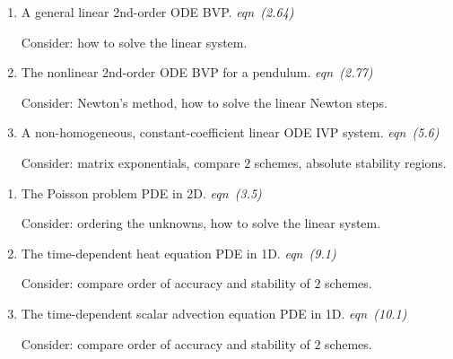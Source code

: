 \documentclass[12pt]{amsart}
\newcommand*\circled[1]{\tikz[baseline=(char.base)]{
            \node[shape=circle,draw,inner sep=2pt] (char) {#1};}}
\begin{document}
\medskip
\noindent \hrulefill

\newcommand{\ecomment}[1]{ \hfill \mbox{\emph{#1}} }

\renewcommand{\labelenumi}{\circled{\arabic{enumi}}}
\begin{enumerate}
\setlength{\itemsep}{4pt}

\item A general linear 2nd-order ODE BVP. \ecomment{eqn (2.64)}

\noindent Consider: how to solve the linear system.
\item The nonlinear 2nd-order ODE BVP for a pendulum.  \ecomment{eqn (2.77)}

\noindent Consider: Newton's method, how to solve the linear Newton steps.
\item A non-homogeneous, constant-coefficient linear ODE IVP system.  \ecomment{eqn (5.6)}

\noindent Consider: matrix exponentials, compare $2$ schemes, absolute stability regions.
\end{enumerate}

\noindent \hrulefill

\renewcommand{\labelenumi}{\circled{\alph{enumi}}}
\begin{enumerate}
\setlength{\itemsep}{4pt}
\item The Poisson problem PDE in 2D. \ecomment{eqn (3.5)}

\noindent Consider: ordering the unknowns, how to solve the linear system.
\item The time-dependent heat equation PDE in 1D. \ecomment{eqn (9.1)}

\noindent Consider: compare order of accuracy and stability of $2$ schemes.
\item The time-dependent scalar advection equation PDE in 1D.  \ecomment{eqn (10.1)}

\noindent Consider: compare order of accuracy and stability of $2$ schemes.
\end{enumerate}
\end{document}
